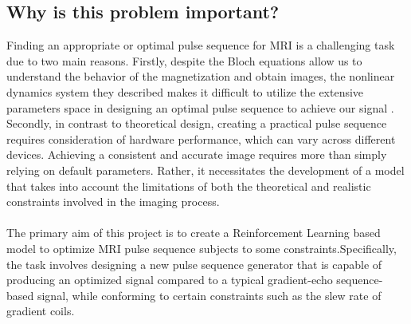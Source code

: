 \subsection{Why is this problem important?}
Finding an appropriate or optimal pulse sequence for MRI is a challenging task due to two main reasons. Firstly, despite the Bloch equations allow us to understand the behavior of the magnetization and obtain images, the nonlinear dynamics system they described makes it difficult to utilize the extensive parameters space in designing an optimal pulse sequence to achieve our signal \citep{0438}. Secondly, in contrast to theoretical design, creating a practical pulse sequence requires consideration of hardware performance, which can vary across different devices. Achieving a consistent and accurate image requires more than simply relying on default parameters. Rather, it necessitates the development of a model that takes into account the limitations of both the theoretical and realistic constraints involved in the imaging process. 
\\\\
The primary aim of this project is to create a Reinforcement Learning based model to optimize MRI pulse sequence subjects to some constraints.Specifically, the task involves designing a new pulse sequence generator that is capable of producing an optimized signal compared to a typical gradient-echo sequence-based signal, while conforming to certain constraints such as the slew rate of gradient coils.